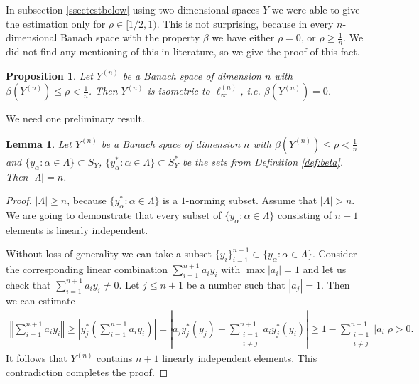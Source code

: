 \documentclass[11pt,a4paper]{amsart}
\newcommand{\norm}[1]{\left\Vert#1\right\Vert}
\numberwithin{equation}{section}
\theoremstyle{plain}
\newtheorem{prop}[theorem]{Proposition}
\newtheorem{lemma}[theorem]{Lemma}
\theoremstyle{definition}
\renewcommand{\leq}{\leqslant}
\renewcommand{\geq}{\geqslant}
\begin{document}
In subsection \ref{ssectestbelow} using two-dimensional spaces $Y$ we were able to give the estimation only for $\rho\in [1/2, 1)$. This is not surprising, because in every $n$-dimensional Banach space with the property $\beta$ we have either $\rho=0$, or $\rho\geq\frac{1}{n}$. We did not find any mentioning of this in literature, so we give the proof of this fact.
\begin{prop}\label{prop_beta}
Let $Y^{(n)}$ be a Banach space of dimension $n$ with $\beta(Y^{(n)})\leq\rho< \frac{1}{n}$. Then $Y^{(n)}$ is isometric to $\ell^{(n)}_\infty$, i.e. $\beta(Y^{(n)})=0$.
\end{prop}


We need one preliminary result.
\begin{lemma}\label{prop_beta_lemma}
Let $Y^{(n)}$ be a Banach space of dimension $n$ with $\beta(Y^{(n)})\leq\rho< \frac{1}{n}$ and $\{y_\alpha: \alpha\in \Lambda\}\subset S_Y$, $\{y^*_\alpha: \alpha\in  \Lambda\}\subset S_Y^*$ be the sets from Definition \ref{def:beta}.
Then $|\Lambda|=n$.
\end{lemma}

\begin{proof}
$|\Lambda|\geq n$, because $\{y^*_\alpha: \alpha\in  \Lambda\} $ is a $1$-norming subset. Assume that $|\Lambda|> n$. We are going to demonstrate that every subset of $\{y_\alpha: \alpha\in \Lambda\}$ consisting of $n+1$ elements is linearly independent.

Without loss of generality we can take a subset $\{y_i\}^{n+1}_{i=1}\subset\{y_\alpha: \alpha\in \Lambda\}$. Consider the corresponding linear combination $\sum \limits_{i=1}^{n+1} a_i y_i$ with $\max|a_i|=1$ and let us check that $\sum \limits_{i=1}^{n+1} a_i y_i\neq 0$. Let $j\leq n+1$ be a number such that $|a_j|=1$. Then we can estimate
\begin{align*}
\norm{\sum \limits_{i=1}^{n+1} a_i y_i}\geq \left|y_j^*\left(\sum \limits_{i=1}^{n+1} a_i y_i\right)\right|=\left|a_j y_j^*(y_j)+ \sum \limits_{\substack{i=1 \\ i\neq j}}^{n+1} a_i y_j^*(y_i)\right|\geq 1 -\sum \limits_{\substack{i=1 \\ i\neq j}}^{n+1} |a_i| \rho>0.
\end{align*}
It follows that $Y^{(n)}$ contains $n+1$ linearly independent elements. This contradiction completes the proof.
\end{proof}
\end{document}
